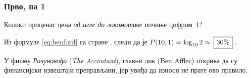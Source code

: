 \subsubsection{Прво, па 1}\label{sssec:benford}

\zadatak  
Колики проценат цена {\sl од игле до локомотиве\/} почиње цифром~1?

\resenje 
Из формуле \eqref{eq:benford} са стране \pageref{eq:benford}, следи да је 
$P(10,1)=\logten 2 \approx \ram{30\%}$.

\dodatak 
У филму {\sl Рачуновођа\/} ({\sl The Accoutant\/}), главни лик (Ben Afflec) открива
да су финансијски извештаји преправљани, јер увиђа да износи
не прате ово правило.
